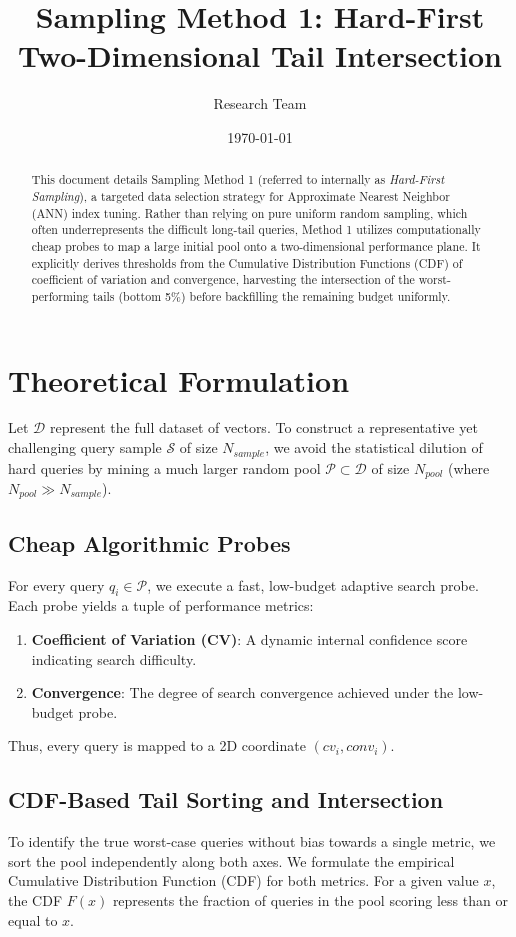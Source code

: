 \documentclass[11pt,a4paper]{article}
\title{\textbf{Sampling Method 1: Hard-First Two-Dimensional Tail Intersection}}
\author{Research Team}
\date{\today}
\begin{document}
\maketitle

\begin{abstract}
This document details Sampling Method 1 (referred to internally as \textit{Hard-First Sampling}), a targeted data selection strategy for Approximate Nearest Neighbor (ANN) index tuning. Rather than relying on pure uniform random sampling, which often underrepresents the difficult long-tail queries, Method 1 utilizes computationally cheap probes to map a large initial pool onto a two-dimensional performance plane. It explicitly derives thresholds from the Cumulative Distribution Functions (CDF) of coefficient of variation and convergence, harvesting the intersection of the worst-performing tails (bottom 5\%) before backfilling the remaining budget uniformly.
\end{abstract}

\section{Theoretical Formulation}

Let $\mathcal{D}$ represent the full dataset of vectors. To construct a representative yet challenging query sample $\mathcal{S}$ of size $N_{sample}$, we avoid the statistical dilution of hard queries by mining a much larger random pool $\mathcal{P} \subset \mathcal{D}$ of size $N_{pool}$ (where $N_{pool} \gg N_{sample}$).

\subsection{Cheap Algorithmic Probes}
For every query $q_i \in \mathcal{P}$, we execute a fast, low-budget adaptive search probe. Each probe yields a tuple of performance metrics:
\begin{enumerate}
    \item \textbf{Coefficient of Variation (CV)}: A dynamic internal confidence score indicating search difficulty.
    \item \textbf{Convergence}: The degree of search convergence achieved under the low-budget probe.
\end{enumerate}
Thus, every query is mapped to a 2D coordinate $(cv_i, conv_i)$.

\subsection{CDF-Based Tail Sorting and Intersection}
To identify the true worst-case queries without bias towards a single metric, we sort the pool independently along both axes. We formulate the empirical Cumulative Distribution Function (CDF) for both metrics. For a given value $x$, the CDF $F(x)$ represents the fraction of queries in the pool scoring less than or equal to $x$.
\end{document}
